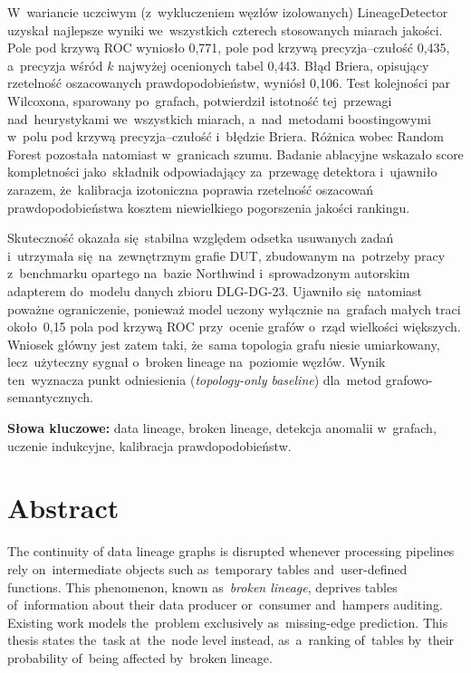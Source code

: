 \documentclass[polish,master,a4paper,oneside]{ppfcmthesis}
\renewcommand{\_}{\origtextunderscore\ifmmode\else\allowbreak\fi}
\begin{document}
W~wariancie uczciwym (z~wykluczeniem węzłów izolowanych) LineageDetector
uzyskał najlepsze wyniki we~wszystkich czterech stosowanych miarach jakości.
Pole pod krzywą ROC wyniosło 0{,}771, pole pod krzywą precyzja–czułość
0{,}435, a~precyzja wśród $k$ najwyżej ocenionych tabel 0{,}443. Błąd Briera,
opisujący rzetelność oszacowanych prawdopodobieństw, wyniósł 0{,}106.
Test kolejności par Wilcoxona, sparowany po~grafach, potwierdził istotność
tej~przewagi nad~heurystykami we~wszystkich miarach, a~nad~metodami
boostingowymi w~polu pod krzywą precyzja–czułość i~błędzie Briera. Różnica wobec
Random Forest pozostała natomiast w~granicach szumu. Badanie ablacyjne wskazało
score kompletności jako~składnik odpowiadający za~przewagę detektora
i~ujawniło zarazem, że~kalibracja izotoniczna poprawia rzetelność oszacowań
prawdopodobieństwa kosztem niewielkiego pogorszenia jakości rankingu.

Skuteczność okazała się~stabilna względem odsetka usuwanych zadań i~utrzymała
się~na~zewnętrznym grafie DUT, zbudowanym na~potrzeby pracy z~benchmarku
opartego na~bazie Northwind i~sprowadzonym autorskim adapterem do~modelu
danych zbioru DLG-DG-23. Ujawniło się~natomiast poważne ograniczenie, ponieważ
model uczony wyłącznie na~grafach małych traci około~0{,}15 pola pod krzywą
ROC przy~ocenie grafów o~rząd wielkości większych. Wniosek główny jest zatem
taki, że~sama topologia grafu niesie umiarkowany, lecz~użyteczny
sygnał o~broken lineage na~poziomie węzłów. Wynik ten~wyznacza punkt
odniesienia (\emph{topology-only baseline}) dla~metod grafowo-semantycznych.

\vspace{1em}\noindent\textbf{Słowa kluczowe:} data lineage, broken lineage,
detekcja anomalii w~grafach, uczenie indukcyjne, kalibracja prawdopodobieństw.

\chapter*{Abstract}

The continuity of data lineage graphs is disrupted whenever processing
pipelines rely on~intermediate objects such as~temporary tables
and~user-defined functions. This phenomenon, known as~\emph{broken lineage},
deprives tables of~information about their data producer or~consumer
and~hampers auditing. Existing work models the~problem exclusively
as~missing-edge prediction. This thesis states the~task at~the~node
level instead, as~a~ranking of~tables by~their probability of~being affected
by~broken lineage.
\end{document}
